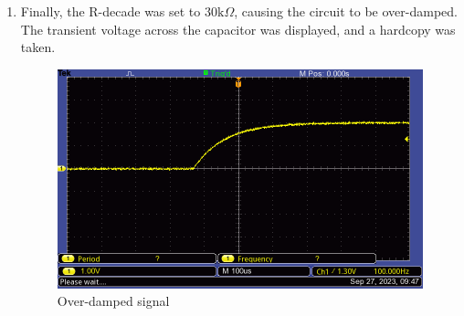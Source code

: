 \begin{enumerate}
    \item Finally, the R-decade was set to $30\text{k}\Omega$, causing the circuit to be over-damped. The transient voltage across the capacitor was displayed, and a hardcopy was taken.
          \begin{figure}[H]
              \centering
              \includegraphics[width=0.6\linewidth]{images/overdamped.png}
              \caption{Over-damped signal}
              \label{fig:over_damped}
          \end{figure}
\end{enumerate}

